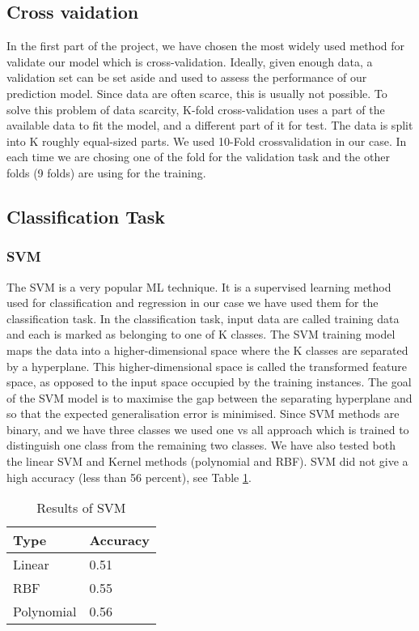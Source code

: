 \documentclass[a4paper,UKenglish]{lipics-v2016}
\begin{document}
 \subsection{Cross vaidation\label{cross validation}}
 In the first part of the project, we have chosen the most widely used method for validate our model which is cross-validation. Ideally, given enough data, a validation set can be set aside and used to assess the performance of our prediction model. Since data are often scarce, this is usually not possible. To solve this problem of data scarcity, K-fold cross-validation uses a part of the available data to fit the model, and a different part of it for test. The data is split into K roughly equal-sized parts. We used 10-Fold crossvalidation in our case. In each time we are chosing one of the fold for the validation task and the other folds (9 folds) are using for the training.

 \subsection{Classification Task\label{classification}}
 \subsubsection{SVM\label{svm}}
 The SVM is a very popular ML technique. It is a supervised learning method used for classification and regression in our case we have used them for the classification task. In the classification task, input data are called training data and each is marked as belonging to one of K classes. The SVM training model maps the data into a higher-dimensional space where the K classes are separated by a hyperplane. This higher-dimensional space is called the transformed feature space, as opposed to the input space occupied by the training instances. The goal of the SVM model is to maximise the gap between the separating
 hyperplane and so that the expected generalisation error is minimised. Since SVM methods are binary, and we have three classes we used one vs all approach which is trained to distinguish one class from the remaining two classes. We have also tested both the linear SVM and Kernel methods (polynomial and RBF). SVM did not give a high accuracy (less than 56 percent), see Table \ref{table:characteristics1}.
 \begin{table}
 \caption{Results of SVM }
 \small
 \begin{center}
 \setlength{\tabcolsep}{0.8em}
 \renewcommand{\arraystretch}{1.5}
 \begin{tabular}{|p{1.5cm}|p{1cm}|}
 \hline
 {Type } & {Accuracy}  \\
 \hline
 Linear & 0.51\\
 \hline
 RBF & 0.55\\
 \hline
 Polynomial & 0.56\\
 \hline
 \end{tabular}
 \end{center}
 \label{table:characteristics1}
 \vspace{-5mm}
 \end{table}
\end{document}
